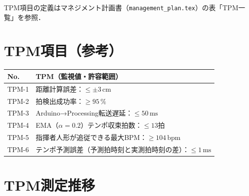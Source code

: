 
TPM項目の定義はマネジメント計画書（\texttt{management\_plan.tex}）の表「TPM一覧」を参照．

\section{TPM項目（参考）}

\begin{table}[H]
  \centering
  \begin{tabularx}{\linewidth}{lX}
    \toprule
    No. & TPM（監視値・許容範囲） \\
    \midrule
    TPM-1 & 距離計算誤差：$\leq \pm 3\,\mathrm{cm}$ \\
    TPM-2 & 拍検出成功率：$\geq 95\,\%$ \\
    TPM-3 & Arduino→Processing転送遅延：$\leq 50\,\mathrm{ms}$ \\
    TPM-4 & EMA（$\alpha=0.2$）テンポ収束拍数：$\leq 13$拍 \\
    TPM-5 & 指揮者人形が追従できる最大BPM：$\geq 104\,\mathrm{bpm}$ \\
    TPM-6 & テンポ予測誤差（予測拍時刻と実測拍時刻の差）：$\leq 1\,\mathrm{ms}$ \\
    \bottomrule
  \end{tabularx}
\end{table}

\section{TPM測定推移}


